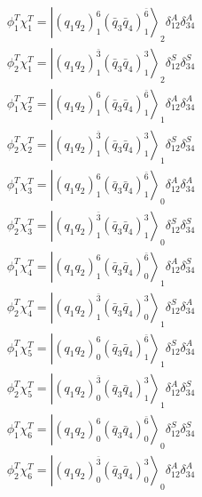 \documentclass[prd,twocolumn,floatfix,nofootinbib]{revtex4}
\begin{document}
\begin{equation}\label{colorspinT}
    \begin{aligned}
        \phi_{1}^{T}\chi_{1}^{T}={\left| {\left(q_{1}q_{2}\right)}_{1}^{6} {\left(\bar{q}_{3}\bar{q}_{4}\right)}_{1}^{\bar{6}} \right\rangle}_{2} \delta_{12}^{A}\delta_{34}^{A} \\
        \phi_{2}^{T}\chi_{1}^{T}={\left| {\left(q_{1}q_{2}\right)}_{1}^{\bar{3}} {\left(\bar{q}_{3}\bar{q}_{4}\right)}_{1}^{3} \right\rangle}_{2} \delta_{12}^{S}\delta_{34}^{S} \\
        \phi_{1}^{T}\chi_{2}^{T}={\left| {\left(q_{1}q_{2}\right)}_{1}^{6} {\left(\bar{q}_{3}\bar{q}_{4}\right)}_{1}^{\bar{6}} \right\rangle}_{1} \delta_{12}^{A}\delta_{34}^{A} \\
        \phi_{2}^{T}\chi_{2}^{T}={\left| {\left(q_{1}q_{2}\right)}_{1}^{\bar{3}} {\left(\bar{q}_{3}\bar{q}_{4}\right)}_{1}^{3} \right\rangle}_{1} \delta_{12}^{S}\delta_{34}^{S} \\
        \phi_{1}^{T}\chi_{3}^{T}={\left| {\left(q_{1}q_{2}\right)}_{1}^{6} {\left(\bar{q}_{3}\bar{q}_{4}\right)}_{1}^{\bar{6}} \right\rangle}_{0} \delta_{12}^{A}\delta_{34}^{A} \\
        \phi_{2}^{T}\chi_{3}^{T}={\left| {\left(q_{1}q_{2}\right)}_{1}^{\bar{3}} {\left(\bar{q}_{3}\bar{q}_{4}\right)}_{1}^{3} \right\rangle}_{0} \delta_{12}^{S}\delta_{34}^{S} \\
        \phi_{1}^{T}\chi_{4}^{T}={\left| {\left(q_{1}q_{2}\right)}_{1}^{6} {\left(\bar{q}_{3}\bar{q}_{4}\right)}_{0}^{\bar{6}} \right\rangle}_{1} \delta_{12}^{A}\delta_{34}^{S} \\
        \phi_{2}^{T}\chi_{4}^{T}={\left| {\left(q_{1}q_{2}\right)}_{1}^{\bar{3}} {\left(\bar{q}_{3}\bar{q}_{4}\right)}_{0}^{3} \right\rangle}_{1} \delta_{12}^{S}\delta_{34}^{A} \\
        \phi_{1}^{T}\chi_{5}^{T}={\left| {\left(q_{1}q_{2}\right)}_{0}^{6} {\left(\bar{q}_{3}\bar{q}_{4}\right)}_{1}^{\bar{6}} \right\rangle}_{1} \delta_{12}^{S}\delta_{34}^{A} \\
        \phi_{2}^{T}\chi_{5}^{T}={\left| {\left(q_{1}q_{2}\right)}_{0}^{\bar{3}} {\left(\bar{q}_{3}\bar{q}_{4}\right)}_{1}^{3} \right\rangle}_{1} \delta_{12}^{A}\delta_{34}^{S} \\
        \phi_{1}^{T}\chi_{6}^{T}={\left| {\left(q_{1}q_{2}\right)}_{0}^{6} {\left(\bar{q}_{3}\bar{q}_{4}\right)}_{0}^{\bar{6}} \right\rangle}_{0} \delta_{12}^{S}\delta_{34}^{S} \\
        \phi_{2}^{T}\chi_{6}^{T}={\left| {\left(q_{1}q_{2}\right)}_{0}^{\bar{3}} {\left(\bar{q}_{3}\bar{q}_{4}\right)}_{0}^{3} \right\rangle}_{0} \delta_{12}^{A}\delta_{34}^{A}
    \end{aligned}
\end{equation}
\end{document}
